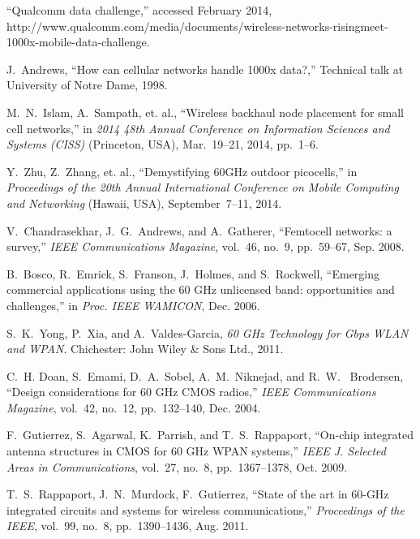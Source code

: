 \documentclass[journal]{IEEEtran}
\begin{document}
\begin{thebibliography}{10}


``Qualcomm data challenge,'' accessed February 2014,
http://www.qualcomm.com/media/documents/wireless-networks-risingmeet- 1000x-mobile-data-challenge.

J.~Andrews, ``How can cellular networks handle 1000x data?,'' Technical talk at University of Notre
Dame, 1998.

M.~N.~Islam, A.~Sampath, et. al., ``Wireless backhaul node placement for small cell networks,'' in
\emph{2014 48th Annual Conference on Information Sciences and Systems (CISS)} (Princeton, USA),
Mar.~19--21, 2014, pp.~1--6.

Y.~Zhu, Z.~Zhang, et. al., ``Demystifying 60GHz outdoor picocells,'' in \emph{Proceedings of the
20th Annual International Conference on Mobile Computing and Networking} (Hawaii, USA),
September~7--11, 2014.



V.~Chandrasekhar, J.~G.~Andrews, and A.~Gatherer, ``Femtocell networks: a survey,'' \emph{IEEE
Communications Magazine}, vol.~46, no.~9, pp.~59--67, Sep. 2008.




B.~Bosco, R.~Emrick, S.~Franson, J.~Holmes, and S.~Rockwell, ``Emerging commercial applications
using the 60 GHz unlicensed band: opportunities and challenges,'' in \emph{Proc. IEEE WAMICON},
Dec. 2006.


S.~K.~Yong, P.~Xia, and A.~Valdes-Garcia, \emph{60 GHz Technology for Gbps WLAN and WPAN}.
Chichester: John Wiley \& Sons Ltd., 2011.





 C.~H. Doan, S.~Emami, D.~A.~Sobel, A.~M.~Niknejad, and R.~W.~ Brodersen, ``Design considerations
for 60 GHz CMOS radios,'' \emph{IEEE Communications Magazine}, vol.~42, no.~12, pp.~132--140, Dec.
2004.

 F.~Gutierrez, S.~Agarwal, K.~Parrish, and T.~S.~Rappaport, ``On-chip integrated antenna structures
in CMOS for 60 GHz WPAN systems,'' \emph{IEEE J. Selected Areas in Communications}, vol.~27, no.~8,
pp.~1367--1378, Oct. 2009.

 T.~S.~Rappaport, J.~N.~Murdock, F.~Gutierrez, ``State of the art in 60-GHz integrated circuits and systems for wireless communications,'' \emph{Proceedings of the IEEE}, vol.~99, no.~8,
pp.~1390--1436, Aug. 2011.


\end{thebibliography}
\end{document}
